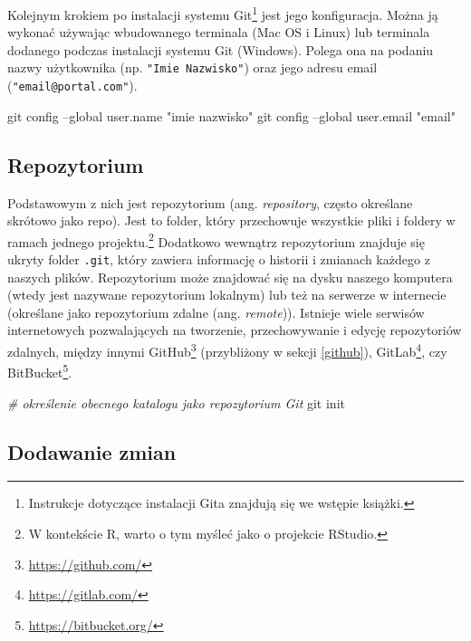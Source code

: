 \documentclass[paper=6in:9in,pagesize=pdftex,headinclude=on,footinclude=on,10pt]{scrbook}
\newenvironment{Shaded}{\begin{snugshade}}{\end{snugshade}}
\newcommand{\CommentTok}[1]{\textcolor[rgb]{0.56,0.35,0.01}{\textit{#1}}}
\newcommand{\FunctionTok}[1]{\textcolor[rgb]{0.00,0.00,0.00}{#1}}
\newcommand{\NormalTok}[1]{#1}
\newcommand{\StringTok}[1]{\textcolor[rgb]{0.31,0.60,0.02}{#1}}
\DeclareRobustCommand{\href}[2]{#2\footnote{\url{#1}}}
\begin{document}
Kolejnym krokiem po instalacji systemu Git\footnote{Instrukcje dotyczące instalacji Gita znajdują się we wstępie książki.} jest jego konfiguracja.
Można ją wykonać używając wbudowanego terminala (Mac OS i Linux) lub terminala dodanego podczas instalacji systemu Git (Windows).
Polega ona na podaniu nazwy użytkownika (np. \texttt{"Imie\ Nazwisko"}) oraz jego adresu email (\texttt{"email@portal.com"}).

\begin{Shaded}
\begin{Highlighting}[]
\FunctionTok{git}\NormalTok{ config --global user.name }\StringTok{"imie nazwisko"}
\FunctionTok{git}\NormalTok{ config --global user.email }\StringTok{"email"}
\end{Highlighting}
\end{Shaded}

\hypertarget{repozytorium}{%
\subsection{Repozytorium}\label{repozytorium}}

Podstawowym z nich jest repozytorium (ang. \emph{repository}, często określane skrótowo jako repo).
Jest to folder, który przechowuje wszystkie pliki i foldery w ramach jednego projektu.\footnote{W kontekście R, warto o tym myśleć jako o projekcie RStudio.}
Dodatkowo wewnątrz repozytorium znajduje się ukryty folder \texttt{.git}, który zawiera informację o historii i zmianach każdego z naszych plików.
Repozytorium może znajdować się na dysku naszego komputera (wtedy jest nazywane repozytorium lokalnym) lub też na serwerze w internecie (określane jako repozytorium zdalne (ang. \emph{remote})).
Istnieje wiele serwisów internetowych pozwalających na tworzenie, przechowywanie i edycję repozytoriów zdalnych, między innymi \href{https://github.com/}{GitHub} (przybliżony w sekcji \ref{github}), \href{https://gitlab.com/}{GitLab}, czy \href{https://bitbucket.org/}{BitBucket}.

\begin{Shaded}
\begin{Highlighting}[]
\CommentTok{# określenie obecnego katalogu jako repozytorium Git}
\FunctionTok{git}\NormalTok{ init                  }
\end{Highlighting}
\end{Shaded}

\hypertarget{dodawanie-zmian}{%
\subsection{Dodawanie zmian}\label{dodawanie-zmian}}
\end{document}
